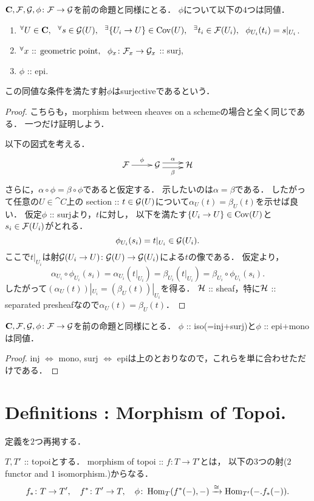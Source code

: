 \documentclass[a4paper, dvipdfmx]{jsarticle}
\begin{document}
\begin{Prop}\label{prop:surj}
    $\mathbf{C}, \mathcal{F}, \mathcal{G}, \phi \colon \mathcal{F} \to \mathcal{G}$を前の命題と同様にとる．
    $\phi$について以下の$4$つは同値．
    \begin{enumerate}
        \item ${}^{\forall} U \in \mathbf{C},~~ {}^{\forall} s \in \mathcal{G}(U),~~ {}^{\exists} \{U_i \to U\} \in \operatorname{Cov}(U),~~
                {}^{\exists} t_i \in \mathcal{F}(U_i),~~ \phi_{U_i}(t_i)=s|_{U_i}$.
        \item ${}^{\forall} x \text{ :: geometric point},~~ \phi_{x} \colon \mathcal{F}_x \to \mathcal{G}_x$ :: surj,
        \item $\phi$ :: epi.
    \end{enumerate}
    この同値な条件を満たす射$\phi$はsurjectiveであるという．
\end{Prop}
\begin{proof}
    こちらも，morphism between sheaves on a schemeの場合と全く同じである．
    一つだけ証明しよう．

    以下の図式を考える．
    \[\xymatrix{
        \shF \ar[r]^-{\phi}& \shG \ar@<1mm>[r]^-{\alpha} \ar@<-1mm>[r]_-{\beta}& \shH
    }\]
    さらに，$\alpha \circ \phi=\beta \circ \phi$であると仮定する．
    示したいのは$\alpha=\beta$である．
    したがって任意の$U \in \cat{C}$上の
    section :: $t \in \mathcal{G}(U)$について$\alpha_U(t)=\beta_U(t)$を示せば良い．
    仮定$\phi$ :: surjより，$t$に対し，
    以下を満たす$\{U_i \to U\} \in \operatorname{Cov}(U)$と$s_i \in \mathcal{F}(U_i)$がとれる．
    \[ \phi_{U_i}(s_i)=t|_{U_i} \in \mathcal{G}(U_i). \]
    ここで$t|_{U_i}$は射$\mathcal{G}(U_i \to U) \colon \mathcal{G}(U) \to \mathcal{G}(U_i)$による$t$の像である．
    仮定より，
    \[
        \alpha_{U_i} \circ \phi_{U_i}(s_i)
        =\alpha_{U_i}(t|_{U_i})=\beta_{U_i}(t|_{U_i})
        =\beta_{U_i} \circ \phi_{U_i}(s_i).
    \]
    したがって$(\alpha_U(t))|_{U_i}=(\beta_U(t))|_{U_i}$を得る．
    $\mathcal{H}$ :: sheaf，特に$\mathcal{H}$ :: separated presheafなので$\alpha_U(t)=\beta_U(t)$．
\end{proof}

\begin{Prop}
    $\mathbf{C}, \mathcal{F}, \mathcal{G}, \phi \colon \mathcal{F} \to \mathcal{G}$を前の命題と同様にとる．
    $\phi$ :: iso(=inj+surj)と$\phi$ :: epi+monoは同値．
\end{Prop}
\begin{proof}
    inj $\iff$ mono, surj $\iff$ epiは上のとおりなので，これらを単に合わせただけである．
\end{proof}

\section{Definitions : Morphism of Topoi.}
定義を$2$つ再掲する．
\begin{Def}
    $T, T'$ :: topoiとする．
    morphism of topoi :: $f \colon T \to T'$とは，
    以下の$3$つの射($2$ functor and $1$ isomorphism.)からなる．
    \[
        f_* \colon T \to T', \quad f^* \colon T' \to T,
        \quad \phi \colon \operatorname{Hom}_{T}(f^*(-), -) \xrightarrow{\cong} \operatorname{Hom}_{T'}(-. f_*(-)).
    \]
\end{Def}
\end{document}
